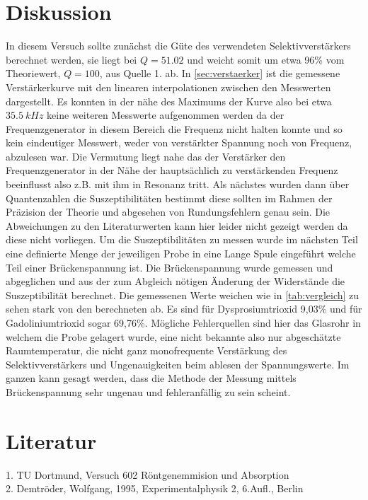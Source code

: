 \section{Diskussion} %
\label{sec:Diskussion}
In diesem Versuch sollte zunächst die Güte des verwendeten Selektivverstärkers berechnet werden,
sie liegt bei $Q=51.02$ und weicht somit um etwa 96\% vom Theoriewert, $Q=100$, aus Quelle 1. ab. In
\autoref{sec:verstaerker} ist die gemessene Verstärkerkurve mit den linearen interpolationen 
zwischen den Messwerten dargestellt. Es konnten
in der nähe des Maximums der Kurve also bei etwa $\SI[]{35.5}[]{kHz}$ keine weiteren Messwerte aufgenommen werden
da der Frequenzgenerator in diesem Bereich die Frequenz nicht halten konnte und so kein eindeutiger 
Messwert, weder von verstärkter Spannung noch von Frequenz, abzulesen war. Die Vermutung liegt nahe das
der Verstärker den Frequenzgenerator in der Nähe der hauptsächlich zu verstärkenden Frequenz beeinflusst
also z.B. mit ihm in Resonanz tritt. Als nächstes wurden dann über Quantenzahlen die Suszeptibilitäten 
bestimmt diese sollten im Rahmen der Präzision der Theorie und abgesehen von Rundungsfehlern genau sein. Die
Abweichungen zu den Literaturwerten kann hier leider nicht gezeigt werden da diese nicht vorliegen.
Um die Suszeptibilitäten zu messen wurde im nächsten Teil eine definierte Menge 
der jeweiligen Probe in eine Lange Spule eingeführt welche Teil einer Brückenspannung
ist. Die Brückenspannung wurde gemessen und abgeglichen und aus der zum Abgleich nötigen Änderung der Widerstände
die Suszeptibilität berechnet. Die gemessenen Werte weichen wie in \autoref{tab:vergleich} zu sehen stark von den berechneten ab.
Es sind für Dysprosiumtrioxid 9,03\% und für Gadoliniumtrioxid sogar 69,76\%. 
Mögliche Fehlerquellen sind hier das Glasrohr in welchem die Probe gelagert wurde,
eine nicht bekannte also nur abgeschätzte Raumtemperatur, die nicht ganz monofrequente Verstärkung des Selektivverstärkers
und Ungenauigkeiten beim ablesen der Spannungswerte.
Im ganzen kann gesagt werden, dass die Methode der Messung mittels Brückenspannung sehr ungenau und fehleranfällig zu sein scheint.
\section{Literatur}
\label{Literatur}
1. TU Dortmund, Versuch 602 Röntgenemmision und Absorption\\
2. Demtröder, Wolfgang, 1995, Experimentalphysik 2, 6.Aufl., Berlin\\
